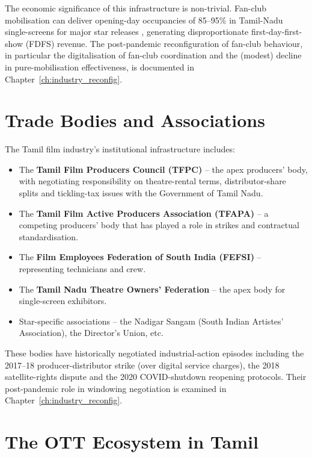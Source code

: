 The economic significance of this infrastructure is non-trivial.
Fan-club mobilisation can deliver opening-day occupancies of
85--95\% in Tamil-Nadu single-screens for major star releases
\citep{ormax2023}, generating disproportionate first-day-first-show
(FDFS) revenue.  The post-pandemic reconfiguration of fan-club
behaviour, in particular the digitalisation of fan-club coordination
and the (modest) decline in pure-mobilisation effectiveness, is
documented in Chapter~\ref{ch:industry_reconfig}.

\section{Trade Bodies and Associations}
\label{sec:trade_bodies}

The Tamil film industry's institutional infrastructure includes:

\begin{itemize}[itemsep=2pt]
\item The \textbf{Tamil Film Producers Council (TFPC)} -- the apex
      producers' body, with negotiating responsibility on
      theatre-rental terms, distributor-share splits and tickling-tax
      issues with the Government of Tamil Nadu.
\item The \textbf{Tamil Film Active Producers Association (TFAPA)}
      -- a competing producers' body that has played a role in
      strikes and contractual standardisation.
\item The \textbf{Film Employees Federation of South India (FEFSI)}
      -- representing technicians and crew.
\item The \textbf{Tamil Nadu Theatre Owners' Federation} -- the
      apex body for single-screen exhibitors.
\item Star-specific associations -- the Nadigar Sangam (South Indian
      Artistes' Association), the Director's Union, etc.
\end{itemize}

These bodies have historically negotiated industrial-action episodes
including the 2017--18 producer-distributor strike (over digital
service charges), the 2018 satellite-rights dispute and the 2020
COVID-shutdown reopening protocols.  Their post-pandemic role in
windowing negotiation is examined in
Chapter~\ref{ch:industry_reconfig}.

\section{The OTT Ecosystem in Tamil}
\label{sec:ott_eco}

